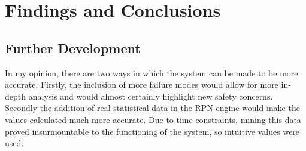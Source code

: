 \documentclass[12pt]{article} %
\begin{document}

\section{Findings and Conclusions}
\subsection{Further Development}
In my opinion, there are two ways in which the system can be made to be more accurate. Firstly, the inclusion of more failure modes would allow for more in-depth analysis and would almost certainly highlight new safety concerns. Secondly the addition of real statistical data in the RPN engine would make the values calculated much more accurate. Due to time constraints, mining this data proved insurmountable to the functioning of the system, so intuitive values were used.
\end{document}
